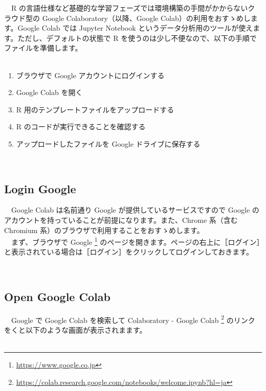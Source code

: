 \documentclass[
  12pt,
]{book}
\DeclareRobustCommand{\href}[2]{#2\footnote{\url{#1}}}
\providecommand{\tightlist}{%
  \setlength{\itemsep}{0pt}\setlength{\parskip}{0pt}}
\begin{document}
　R の言語仕様など基礎的な学習フェーズでは環境構築の手間がかからないクラウド型の Google Colaboratory（以降、Google Colab）の利用をおすゝめします。Google Colab では Jupyter Notebook というデータ分析用のツールが使えます。ただし、デフォルトの状態で R を使うのは少し不便なので、以下の手順でファイルを準備します。\\
　

\begin{enumerate}
\def\labelenumi{\arabic{enumi}.}
\tightlist
\item
  ブラウザで Google アカウントにログインする
\item
  Google Colab を開く
\item
  R 用のテンプレートファイルをアップロードする
\item
  R のコードが実行できることを確認する
\item
  アップロードしたファイルを Google ドライブに保存する
\end{enumerate}

　

\hypertarget{login-google}{%
\subsection{Login Google}\label{login-google}}

　Google Colab は名前通り Google が提供しているサービスですので Google のアカウントを持っていることが前提になります。また、Chrome 系（含む Chromium 系）のブラウザで利用することをおすゝめします。\\
　まず、ブラウザで \href{https://www.google.co.jp}{Google } のページを開きます。ページの右上に［ログイン］と表示されている場合は［ログイン］をクリックしてログインしておきます。

　

\hypertarget{open-google-colab}{%
\subsection{Open Google Colab}\label{open-google-colab}}

　Google で Google Colab を検索して \href{https://colab.research.google.com/notebooks/welcome.ipynb?hl=ja}{Colaboratory - Google Colab } のリンクをくと以下のような画面が表示されまます。\\
　
\end{document}
